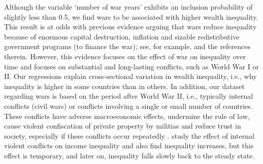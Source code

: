 \documentclass[a4paper,11pt]{article}
\begin{document}
Although the variable `number of war years' exhibits an inclusion probability of slightly less than 0.5, we find wars to be associated with higher wealth inequality. This result is at odds with previous evidence arguing that wars reduce inequality because of enormous capital destruction, inflation and sizable redistributive government programs (to finance the war); see, for example, \citep{piketty2014,milanovic2016global} and the references therein. However, this evidence focuses on the effect of war on inequality over time and focuses on substantial and long-lasting conflicts, such as World War I or II. Our regressions explain cross-sectional variation in wealth inequality, i.e., why inequality is higher in some countries than in others. In addition, our dataset regarding wars is based on the period after World War II, i.e., typically internal conflicts (civil wars) or conflicts involving a single or small number of countries. These conflicts have adverse macroeconomic effects, undermine the rule of law, cause violent confiscation of private property by militias and reduce trust in society, especially if these conflicts occur repeatedly \citep{bircanetal}. \citet{bircanetal} study the effect of internal violent conflicts on income inequality and also find inequality increases, but this effect is temporary, and later on, inequality falls slowly back to the steady state.
\end{document}
